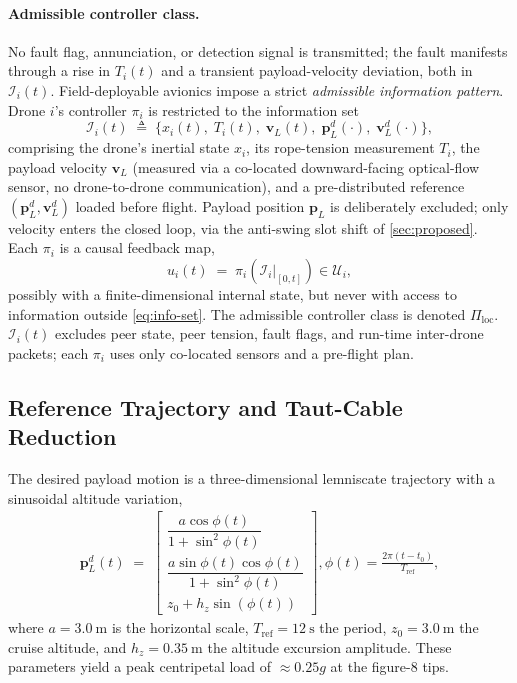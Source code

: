 \documentclass[lettersize,journal]{IEEEtran}
\newcommand{\vect}[1]{\boldsymbol{#1}}
\begin{document}
\paragraph{Admissible controller class.} No fault flag, annunciation, or detection signal is transmitted; the fault manifests through a rise in $T_i(t)$ and a transient payload-velocity deviation, both in $\mathcal{I}_i(t)$. Field-deployable avionics impose a strict \emph{admissible information pattern}. Drone $i$'s controller $\pi_i$ is restricted to the information set
\begin{equation}
  \mathcal{I}_i(t) \;\triangleq\;
    \bigl\{x_i(t),\; T_i(t),\; \vect v_L(t),\;
      \vect p_L^d(\cdot),\; \vect v_L^d(\cdot)\bigr\},
  \label{eq:info-set}
\end{equation}
comprising the drone's inertial state $x_i$, its rope-tension measurement $T_i$, the payload velocity $\vect v_L$ (measured via a co-located downward-facing optical-flow sensor, no drone-to-drone communication), and a pre-distributed reference $({\vect p}_L^d, {\vect v}_L^d)$ loaded before flight. Payload position $\vect p_L$ is deliberately excluded; only velocity enters the closed loop, via the anti-swing slot shift of \cref{sec:proposed}. Each $\pi_i$ is a causal feedback map,
\begin{equation}
 u_i(t) \;=\; \pi_i\!\left(
    \left.\mathcal{I}_i\right|_{[0,t]}
  \right) \in \mathcal{U}_i,
  \label{eq:controller-map}
\end{equation}
possibly with a finite-dimensional internal state, but never with access to information outside \eqref{eq:info-set}. The admissible controller class is denoted $\Pi_{\mathrm{loc}}$. $\mathcal{I}_i(t)$ excludes peer state, peer tension, fault flags, and run-time inter-drone packets; each $\pi_i$ uses only co-located sensors and a pre-flight plan.

\subsection{Reference Trajectory and Taut-Cable Reduction}
\label{sec:reduction-and-reference}

The desired payload motion is a three-dimensional lemniscate trajectory with a sinusoidal altitude variation,
\begin{align}
  \label{eq:lemniscate}
  \vect p_L^d(t) \;=\;
    \begin{bmatrix}
      \dfrac{a\cos\phi(t)}{1 + \sin^2\!\phi(t)} \\[6pt]
      \dfrac{a\sin\phi(t)\cos\phi(t)}{1 + \sin^2\!\phi(t)} \\[6pt]
 z_0 + h_z\sin(\phi(t))
    \end{bmatrix},
  \phi(t) = \frac{2\pi(t - t_0)}{T_{\mathrm{ref}}},
\end{align}
where $a = \SI{3.0}{\metre}$ is the horizontal scale, $T_{\mathrm{ref}} = \SI{12}{\second}$ the period, $z_0 = \SI{3.0}{\metre}$ the cruise altitude, and $h_z = \SI{0.35}{\metre}$ the altitude excursion amplitude. These parameters yield a peak centripetal load of $\approx 0.25g$ at the figure-8 tips.
\end{document}
